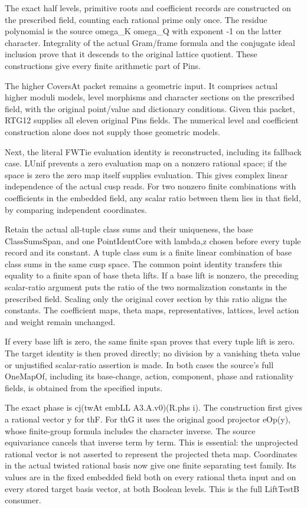 The exact half levels, primitive roots and coefficient records are constructed on the prescribed field, counting each rational prime only once. The residue polynomial is the source omega\_\allowbreak{}K omega\_\allowbreak{}Q with exponent -1 on the latter character. Integrality of the actual Gram/\allowbreak{}frame formula and the conjugate ideal inclusion prove that it descends to the original lattice quotient. These constructions give every finite arithmetic part of Pins.

The higher CoversAt packet remains a geometric input. It comprises actual higher moduli models, level morphisms and character sections on the prescribed field, with the original point/\allowbreak{}value and dictionary conditions. Given this packet, RTG12 supplies all eleven original Pins fields. The numerical level and coefficient construction alone does not supply those geometric models.

Next, the literal FWTie evaluation identity is reconstructed, including its fallback case. LUnif prevents a zero evaluation map on a nonzero rational space; if the space is zero the zero map itself supplies evaluation. This gives complex linear independence of the actual cusp reads. For two nonzero finite combinations with coefficients in the embedded field, any scalar ratio between them lies in that field, by comparing independent coordinates.

Retain the actual all-tuple class sums and their uniqueness, the base ClassSumsSpan, and one PointIdentCore with lambda,z chosen before every tuple record and its constant. A tuple class sum is a finite linear combination of base class sums in the same cusp space. The common point identity transfers this equality to a finite span of base theta lifts. If a base lift is nonzero, the preceding scalar-ratio argument puts the ratio of the two normalization constants in the prescribed field. Scaling only the original cover section by this ratio aligns the constants. The coefficient maps, theta maps, representatives, lattices, level action and weight remain unchanged.

If every base lift is zero, the same finite span proves that every tuple lift is zero. The target identity is then proved directly; no division by a vanishing theta value or unjustified scalar-ratio assertion is made. In both cases the source's full OneMapOf, including its base-change, action, component, phase and rationality fields, is obtained from the specified inputs.

The exact phase is cj(twAt embLL A3.A.v0)(R.phs i). The construction first gives a rational vector y for thF. For thG it uses the original good projector eOp(y), whose finite-group formula includes the character inverse. The source equivariance cancels that inverse term by term. This is essential: the unprojected rational vector is not asserted to represent the projected theta map. Coordinates in the actual twisted rational basis now give one finite separating test family. Its values are in the fixed embedded field both on every rational theta input and on every stored target basis vector, at both Boolean levels. This is the full LiftTestB consumer.

